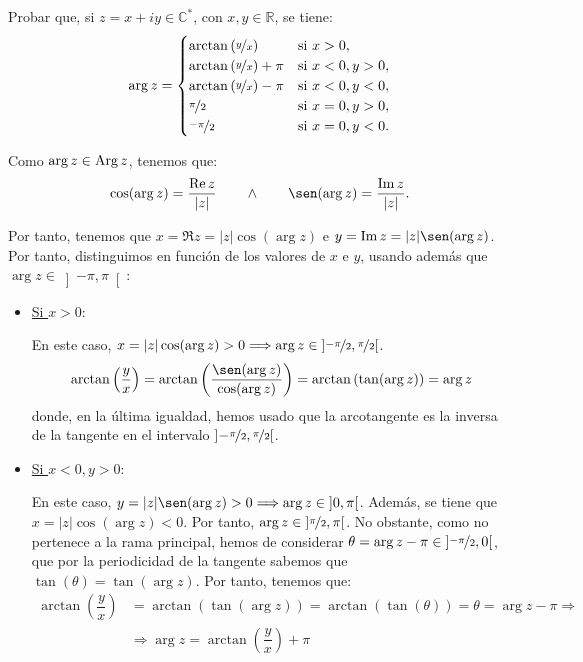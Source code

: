 \begin{ejercicio}
    Probar que, si $z = x+iy \in \mathbb{C}^*$, con $x,y \in \mathbb{R}$, se tiene:
    \[
        \arg z = \begin{cases}
            \arctan\left(\nicefrac{y}{x}\right) & \text{si } x > 0, \\
            \arctan\left(\nicefrac{y}{x}\right) + \pi & \text{si } x < 0, y > 0, \\
            \arctan\left(\nicefrac{y}{x}\right) - \pi & \text{si } x < 0, y < 0, \\
            \nicefrac{\pi}{2} & \text{si } x = 0, y > 0, \\
            \nicefrac{-\pi}{2} & \text{si } x = 0, y < 0.
        \end{cases}
    \]
    
    Como $\arg z\in\operatorname{Arg} z$, tenemos que:
    \begin{equation*}
        \cos (\arg z) = \dfrac{\Re z}{|z|} \qquad \land \qquad \sen(\arg z) = \dfrac{\Im z}{|z|}.
    \end{equation*}

    Por tanto, tenemos que $x=\Re z = |z|\cos(\arg z)$ e $y=\Im z = |z|\sen(\arg z)$. Por tanto, distinguimos en función de los valores de $x$ e $y$, usando además que $\arg z\in \left]-\pi,\pi\right[$:
    \begin{itemize}
        \item \ul{Si $x>0$}:
        
        En este caso, $x=|z|\cos(\arg z)>0\Longrightarrow \arg z\in \left]\nicefrac{-\pi}{2},\nicefrac{\pi}{2}\right[$.
        \begin{align*}
            \arctan\left(\dfrac{y}{x}\right) = \arctan\left(\dfrac{\sen(\arg z)}{\cos(\arg z)}\right) = \arctan\left(\tan(\arg z)\right) = \arg z
        \end{align*}
        donde, en la última igualdad, hemos usado que la arcotangente es la inversa de la tangente en el intervalo $\left]-\nicefrac{\pi}{2},\nicefrac{\pi}{2}\right[$.

        \item \ul{Si $x<0, y>0$}:
        
        En este caso, $y=|z|\sen(\arg z)>0\Longrightarrow \arg z\in \left]0,\pi\right[$. Además, se tiene que $x=|z|\cos(\arg z)<0$. Por tanto, $\arg z\in \left]\nicefrac{\pi}{2},\pi\right[$. No obstante, como no pertenece a la rama principal, hemos de considerar $\theta = \arg z - \pi\in \left]\nicefrac{-\pi}{2},0\right[$, que por la periodicidad de la tangente sabemos que $\tan(\theta)=\tan(\arg z)$. Por tanto, tenemos que:
        \begin{align*}
            \arctan\left(\dfrac{y}{x}\right) &= \arctan\left(\tan(\arg z)\right) = \arctan\left(\tan(\theta)\right) = \theta = \arg z - \pi
            \Longrightarrow\\&\Longrightarrow
            \arg z = \arctan\left(\dfrac{y}{x}\right) + \pi
        \end{align*}
        

\end{itemize}
\end{ejercicio}
